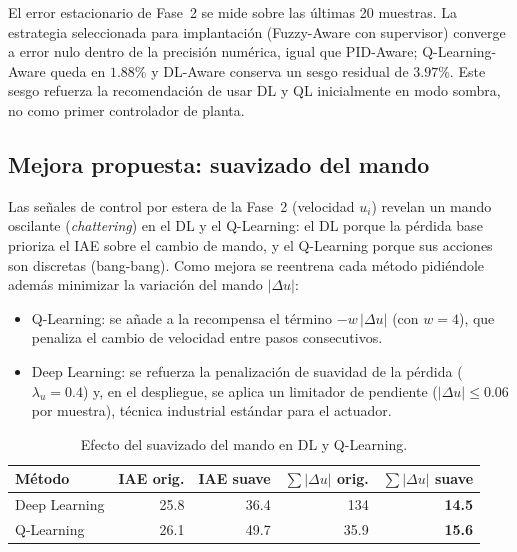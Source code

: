 El error estacionario de Fase~2 se mide sobre las últimas 20 muestras. La estrategia seleccionada para implantación (Fuzzy-Aware con supervisor) converge a error nulo dentro de la precisión numérica, igual que PID-Aware; Q-Learning-Aware queda en $1.88\%$ y DL-Aware conserva un sesgo residual de $3.97\%$. Este sesgo refuerza la recomendación de usar DL y QL inicialmente en modo sombra, no como primer controlador de planta.

\subsection*{Mejora propuesta: suavizado del mando}

Las señales de control por estera de la Fase~2 (velocidad $u_i$) revelan un mando oscilante (\emph{chattering}) en el DL y el Q-Learning: el DL porque la pérdida base prioriza el IAE sobre el cambio de mando, y el Q-Learning porque sus acciones son discretas (bang-bang). Como mejora se reentrena cada método pidiéndole además minimizar la variación del mando $|\Delta u|$:
\begin{itemize}
  \item Q-Learning: se añade a la recompensa el término $-w\,|\Delta u|$ (con $w=4$), que penaliza el cambio de velocidad entre pasos consecutivos.
  \item Deep Learning: se refuerza la penalización de suavidad de la pérdida ($\lambda_u=0.4$) y, en el despliegue, se aplica un limitador de pendiente ($|\Delta u|\leq 0.06$ por muestra), técnica industrial estándar para el actuador.
\end{itemize}


\begin{table}[H]
\centering
\caption{Efecto del suavizado del mando en DL y Q-Learning.}
\label{tab:suavizado_mando}
\small
\begin{tabular}{@{}lrrrr@{}}
\toprule
Método & IAE orig. & IAE suave & $\sum|\Delta u|$ orig. & $\sum|\Delta u|$ suave \\ \midrule
Deep Learning & 25.8 & 36.4 & 134 & \textbf{14.5} \\
Q-Learning    & 26.1 & 49.7 & \phantom{0}35.9 & \textbf{15.6} \\
\bottomrule
\end{tabular}
\end{table}

